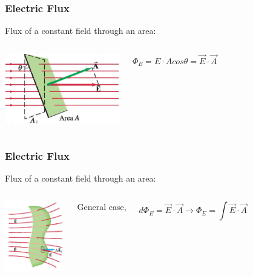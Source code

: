 \documentclass[]{beamer}
\begin{document}
\begin{frame}
\frametitle{Electric Flux}

Flux of a constant field through an area:
\pause

   \begin{columns}[c]
   \column{2in}  %

    \begin{center}
  \includegraphics[height=1.2in]{images5/Eflux.jpg}
\end{center}

  
   \column{2in}



\begin{equation*}
\Phi_E=E\cdot A cos\theta=\vec{E}\cdot \vec{A}
\end{equation*}



   \end{columns}



  \end{frame}




\begin{frame}
\frametitle{Electric Flux}

Flux of a constant field through an area:
\pause

   \begin{columns}[c]
   \column{2in}  %

    \begin{center}
  \includegraphics[height=1.2in]{images5/Eflux2.jpg}
\end{center}

  
   \column{2in}



General case,

\pause
\begin{equation*}
d\Phi_E=\vec{E}\cdot\vec{A}\rightarrow \Phi_E=\int \vec{E}\cdot\vec{A}
\end{equation*}


   \end{columns}



  \end{frame}
\end{document}
